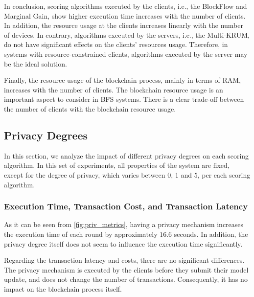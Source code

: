 In conclusion, scoring algorithms executed by the clients, i.e., the BlockFlow and Marginal Gain, show higher execution time increases with the number of clients. In addition, the resource usage at the clients increases linearly with the number of devices. In contrary, algorithms executed by the servers, i.e., the Multi-KRUM, do not have significant effects on the clients' resources usage. Therefore, in systems with resource-constrained clients, algorithms executed by the server may be the ideal solution.

Finally, the resource usage of the blockchain process, mainly in terms of RAM, increases with the number of clients. The blockchain resource usage is an important aspect to consider in BFS systems. There is a clear trade-off between the number of clients with the blockchain resource usage.

\subsection{Privacy Degrees}

In this section, we analyze the impact of different privacy degrees on each scoring algorithm. In this set of experiments, all properties of the system are fixed, except for the degree of privacy, which varies between 0, 1 and 5, per each scoring algorithm.

\subsubsection{Execution Time, Transaction Cost, and Transaction Latency}

As it can be seen from \autoref{fig:priv_metrics}, having a privacy mechanism increases the execution time of each round by approximately $16.6$ seconds. In addition, the privacy degree itself does not seem to influence the execution time significantly.


Regarding the transaction latency and costs, there are no significant differences. The privacy mechanism is executed by the clients before they submit their model update, and does not change the number of transactions. Consequently, it has no impact on the blockchain process itself.


